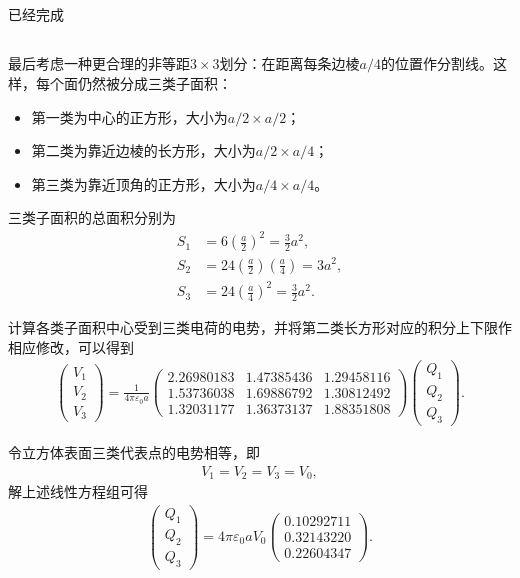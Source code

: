 \documentclass{article}
\begin{document}
\subsection{}
已经完成
\subsection{}
最后考虑一种更合理的非等距$3\times 3$划分：在距离每条边棱$a/4$的位置作分割线。这样，每个面仍然被分成三类子面积：

\begin{itemize}
    \item 第一类为中心的正方形，大小为$a/2\times a/2$；
    \item 第二类为靠近边棱的长方形，大小为$a/2\times a/4$；
    \item 第三类为靠近顶角的正方形，大小为$a/4\times a/4$。
\end{itemize}

三类子面积的总面积分别为
\begin{align}
    S_1
    &=
    6\left(\frac{a}{2}\right)^2
    =
    \frac{3}{2}a^2,
    \\
    S_2
    &=
    24\left(\frac{a}{2}\right)
    \left(\frac{a}{4}\right)
    =
    3a^2,
    \\
    S_3
    &=
    24\left(\frac{a}{4}\right)^2
    =
    \frac{3}{2}a^2.
\end{align}

计算各类子面积中心受到三类电荷的电势，并将第二类长方形对应的积分上下限作相应修改，可以得到
\begin{align}
\boxed{
\begin{pmatrix}
V_1\\
V_2\\
V_3
\end{pmatrix}
=
\frac{1}{4\pi\varepsilon_0a}
\begin{pmatrix}
2.26980183 & 1.47385436 & 1.29458116\\
1.53736038 & 1.69886792 & 1.30812492\\
1.32031177 & 1.36373137 & 1.88351808
\end{pmatrix}
\begin{pmatrix}
Q_1\\
Q_2\\
Q_3
\end{pmatrix}.
}
\end{align}

令立方体表面三类代表点的电势相等，即
\begin{align}
    V_1=V_2=V_3=V_0,
\end{align}
解上述线性方程组可得
\begin{align}
\boxed{
\begin{pmatrix}
Q_1\\
Q_2\\
Q_3
\end{pmatrix}
=
4\pi\varepsilon_0aV_0
\begin{pmatrix}
0.10292711\\
0.32143220\\
0.22604347
\end{pmatrix}.
}
\end{align}
\end{document}
